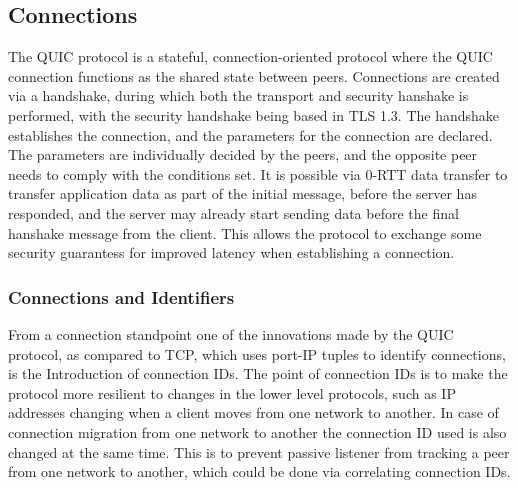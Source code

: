 \documentclass[english, 12pt, a4paper, elec, utf8, a-2b, online]{aaltothesis}
\begin{document}
\subsection{Connections}

The QUIC protocol is a stateful, connection-oriented protocol where the QUIC
connection functions as the shared state between peers. Connections are created
via a handshake, during which both the transport and security hanshake is performed,
with the security handshake being based in TLS 1.3\cite{rfc9001}. The handshake establishes
the connection, and the parameters for the connection are declared. The parameters
are individually decided by the peers, and the opposite peer needs to comply with
the conditions set. It is possible via 0-RTT data transfer to transfer application
data as part of the initial message, before the server has responded, and the server
may already start sending data before the final hanshake message from the client.
This allows the protocol to exchange some security guarantess for improved latency
when establishing a connection\cite{rfc9000}.

\subsubsection{Connections and Identifiers}

From a connection standpoint one of the innovations made by the QUIC protocol, as
compared to TCP, which uses port-IP tuples to identify connections, is the Introduction
of connection IDs. The point of connection IDs is to make the protocol more resilient
to changes in the lower level protocols, such as IP addresses changing when a client
moves from one network to another. In case of connection migration from one network to
another the connection ID used is also changed at the same time. This is to prevent
passive listener from tracking a peer from one network to another, which could be
done via correlating connection IDs\cite{rfc9000}.
\end{document}
